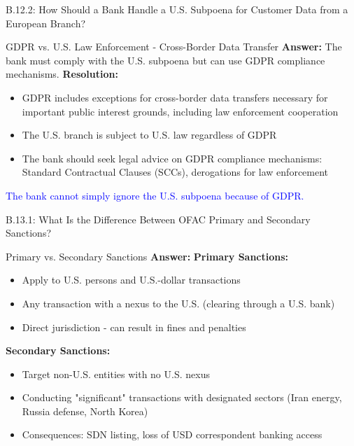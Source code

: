 \documentclass{beamer}
\begin{document}
	\begin{frame}{B.12.2: How Should a Bank Handle a U.S. Subpoena for Customer Data from a European Branch?}
		\begin{block}{GDPR vs. U.S. Law Enforcement - Cross-Border Data Transfer}
			\textbf{Answer:} The bank must comply with the U.S. subpoena but can use GDPR compliance mechanisms.
			\vspace{0.2cm}
			\textbf{Resolution:}
			\begin{itemize}
				\item GDPR includes exceptions for cross-border data transfers necessary for important public interest grounds, including law enforcement cooperation
				\item The U.S. branch is subject to U.S. law regardless of GDPR
				\item The bank should seek legal advice on GDPR compliance mechanisms: Standard Contractual Clauses (SCCs), derogations for law enforcement
			\end{itemize}
			\textcolor{blue}{The bank cannot simply ignore the U.S. subpoena because of GDPR.}
		\end{block}
	\end{frame}
	
	
	\begin{frame}{B.13.1: What Is the Difference Between OFAC Primary and Secondary Sanctions?}
		\begin{block}{Primary vs. Secondary Sanctions}
			\textbf{Answer:} 
			\vspace{0.2cm}
			\textbf{Primary Sanctions:}
			\begin{itemize}
				\item Apply to U.S. persons and U.S.-dollar transactions
				\item Any transaction with a nexus to the U.S. (clearing through a U.S. bank)
				\item Direct jurisdiction - can result in fines and penalties
			\end{itemize}
			\textbf{Secondary Sanctions:}
			\begin{itemize}
				\item Target non-U.S. entities with no U.S. nexus
							\item Conducting "significant" transactions with designated sectors (Iran energy, Russia defense, North Korea)
				\item Consequences: SDN listing, loss of USD correspondent banking access
			\end{itemize}
		\end{block}
	\end{frame}
	
\end{document}
